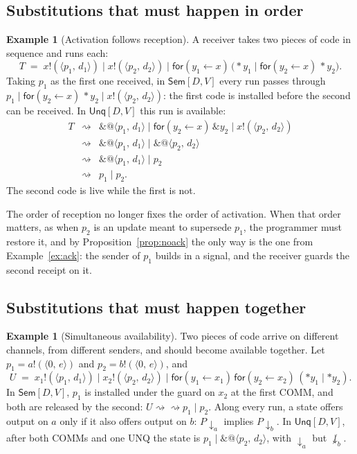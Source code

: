 \documentclass[11pt,a4paper]{article}
\makeatletter
\theoremstyle{plain}
\theoremstyle{definition}
\newtheorem{example}[theorem]{Example}
\theoremstyle{remark}
\newcommand{\pr}[2]{\langle #1,\,#2\rangle}
\newcommand{\qn}[2]{@\langle #1,\,#2\rangle}
\newcommand{\out}[2]{#1!(#2)}
\newcommand{\rcv}[3]{\mathsf{for}(#1 \leftarrow #2)\,#3}
\newcommand{\drop}[1]{{*}#1}
\newcommand{\unq}[1]{\mathop{\&}#1}
\newcommand{\red}{\rightsquigarrow}
\newcommand{\Sem}{\textsf{Sem}[D,V]}
\newcommand{\Unq}{\textsf{Unq}[D,V]}
\newcommand{\barb}[1]{\mathop{\downarrow}_{#1}}
\newcommand{\nbarb}[1]{\mathop{\not\downarrow}_{#1}}
\makeatother
\begin{document}
\subsection{Substitutions that must happen in order}

\begin{example}[Activation follows reception]\label{ex:order}
A receiver takes two pieces of code in sequence and runs each:
\[
  T \;=\; \out{x}{\pr{p_1}{d_1}}\mid\out{x}{\pr{p_2}{d_2}}\mid
       \rcv{y_1}{x}{\big(\drop{y_1}\mid\rcv{y_2}{x}{\drop{y_2}}\big)}.
\]
Taking $p_1$ as the first one received, in $\Sem$ every run passes through
$p_1\mid\rcv{y_2}{x}{\drop{y_2}}\mid\out{x}{\pr{p_2}{d_2}}$: the first code
is installed before the second can be received. In $\Unq$ this run is
available:
\[
\begin{array}{rcl}
T & \red & \unq{\qn{p_1}{d_1}}\mid\rcv{y_2}{x}{\unq{y_2}}\mid\out{x}{\pr{p_2}{d_2}}\\
  & \red & \unq{\qn{p_1}{d_1}}\mid\unq{\qn{p_2}{d_2}}\\
  & \red & \unq{\qn{p_1}{d_1}}\mid p_2\\
  & \red & p_1\mid p_2 .
\end{array}
\]
The second code is live while the first is not.
\end{example}

The order of reception no longer fixes the order of activation. When that
order matters, as when $p_2$ is an update meant to supersede $p_1$, the
programmer must restore it, and by Proposition~\ref{prop:noack} the only way
is the one from Example~\ref{ex:ack}: the sender of $p_1$ builds in a
signal, and the receiver guards the second receipt on it.

\subsection{Substitutions that must happen together}

\begin{example}[Simultaneous availability]\label{ex:together}
Two pieces of code arrive on different channels, from different senders, and
should become available together. Let $p_1=\out{a}{\pr{0}{e}}$ and
$p_2=\out{b}{\pr{0}{e}}$, and
\[
  U \;=\; \out{x_1}{\pr{p_1}{d_1}}\mid\out{x_2}{\pr{p_2}{d_2}}\mid
       \rcv{y_1}{x_1}{\rcv{y_2}{x_2}{(\drop{y_1}\mid\drop{y_2})}}.
\]
In $\Sem$, $p_1$ is installed under the guard on $x_2$ at the first COMM, and
both are released by the second: $U\red\red p_1\mid p_2$. Along every run,
a state offers output on $a$ only if it also offers output on $b$:
$P\barb{a}$ implies $P\barb{b}$. In $\Unq$, after both COMMs and one UNQ the
state is $p_1\mid\unq{\qn{p_2}{d_2}}$, with $\barb{a}$ but $\nbarb{b}$.
\end{example}
\end{document}
